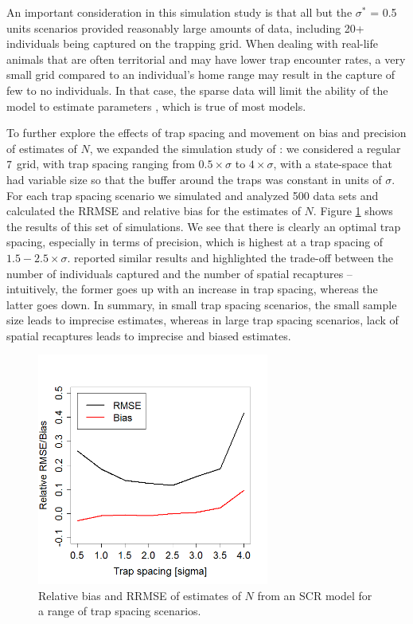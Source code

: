 An important consideration in this simulation study is that all but
the $\sigma^*$ = 0.5 units scenarios provided reasonably large amounts
of data, including 20+ individuals being captured on the trapping
grid. When dealing with real-life animals that are often territorial
and may have lower trap encounter rates, a very small grid compared to
an individual's home range may result in the capture of few to no
individuals. In that case, the sparse data will limit the ability of
the model to estimate parameters \citep{marques_etal:2011}, which is true
of most models.


To further explore the effects of trap spacing and movement on bias
and precision of estimates of $N$, we expanded the simulation study of
\citet{sollmann_etal:2012}: we considered a regular $7 \time 7$ grid,
with trap spacing ranging from $0.5 \times \sigma$ to $4 \times
\sigma$, with a state-space that had variable size so that the buffer
around the traps was constant in units of $\sigma$.  For each trap
spacing scenario we simulated and analyzed 500 data sets and
calculated the RRMSE and relative bias for the estimates of
$N$. Figure \ref{design.fig.rmse} shows the results of this set of
simulations. We see that there is clearly an optimal trap spacing,
especially in terms of precision, which is highest at a trap spacing
of $1.5 - 2.5 \times \sigma$. \citet{efford:2012wbbw} reported similar
results and highlighted the trade-off between the number of
individuals captured and the number of spatial recaptures --
intuitively, the former goes up with an increase in trap spacing,
whereas the latter goes down. In summary, in small trap spacing
scenarios, the small sample size leads to imprecise estimates, whereas
in large trap spacing scenarios, lack of spatial recaptures leads to
imprecise and biased estimates.

\begin{figure}[ht]
\centering
\includegraphics[width=3in]{Ch10-Design/figs/RMSE2.png}
\caption{Relative bias and RRMSE of estimates of $N$ from an SCR model for a range of trap spacing scenarios.}
\label{design.fig.rmse}
\end{figure}






